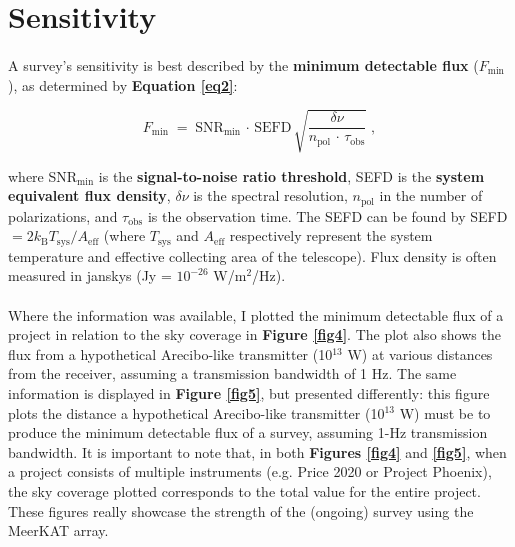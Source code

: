 \documentclass{article}
\begin{document}
\section{Sensitivity}

\paragraph{}
A survey's sensitivity is best described by the \textbf{minimum detectable flux} ($F_{\textrm{min}}$), as determined by \textbf{Equation \ref{eq2}}:

\begin{equation}
F_{\textrm{min}} \; = \; \textrm{SNR}_{\textrm{min}} \, \cdot \, \textrm{SEFD} \, \sqrt{\frac{\delta \nu}{n_{\textrm{pol}} \, \cdot \, \tau_{\textrm{obs}}}} \; ,
\label{eq2}
\end{equation}

where SNR$_{\textrm{min}}$ is the \textbf{signal-to-noise ratio threshold}, SEFD is the \textbf{system equivalent flux density}, $\delta \nu$ is the spectral resolution, $n_{\textrm{pol}}$ in the number of polarizations, and $\tau_{\textrm{obs}}$ is the observation time. The SEFD can be found by SEFD $= 2 k_{\textrm{B}} T_{\textrm{sys}} / A_{\textrm{eff}}$ (where $T_{\textrm{sys}}$ and $A_{\textrm{eff}}$ respectively represent the system temperature and effective collecting area of the telescope). Flux density is often measured in janskys (Jy = $10^{-26}$ W/m$^2$/Hz).

\paragraph{}
Where the information was available, I plotted the minimum detectable flux of a project in relation to the sky coverage in \textbf{Figure \ref{fig4}}. The plot also shows the flux from a hypothetical Arecibo-like transmitter (10$^{13}$ W) at various distances from the receiver, assuming a transmission bandwidth of 1 Hz. The same information is displayed in \textbf{Figure \ref{fig5}}, but presented differently: this figure plots the distance a hypothetical Arecibo-like transmitter (10$^{13}$ W) must be to produce the minimum detectable flux of a survey, assuming 1-Hz transmission bandwidth. It is important to note that, in both \textbf{Figures \ref{fig4}} and \textbf{\ref{fig5}}, when a project consists of multiple instruments (e.g. Price 2020 or Project Phoenix), the sky coverage plotted corresponds to the total value for the entire project. These figures really showcase the strength of the (ongoing) survey using the MeerKAT array.
\end{document}
